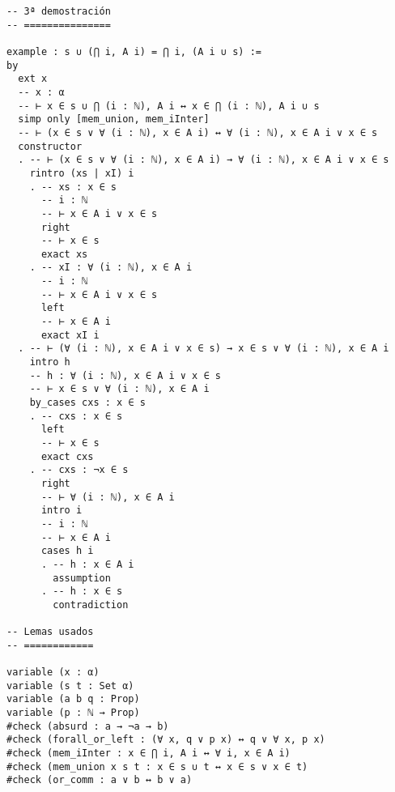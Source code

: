 \begin{verbatim}
-- 3ª demostración
-- ===============

example : s ∪ (⋂ i, A i) = ⋂ i, (A i ∪ s) :=
by
  ext x
  -- x : α
  -- ⊢ x ∈ s ∪ ⋂ (i : ℕ), A i ↔ x ∈ ⋂ (i : ℕ), A i ∪ s
  simp only [mem_union, mem_iInter]
  -- ⊢ (x ∈ s ∨ ∀ (i : ℕ), x ∈ A i) ↔ ∀ (i : ℕ), x ∈ A i ∨ x ∈ s
  constructor
  . -- ⊢ (x ∈ s ∨ ∀ (i : ℕ), x ∈ A i) → ∀ (i : ℕ), x ∈ A i ∨ x ∈ s
    rintro (xs | xI) i
    . -- xs : x ∈ s
      -- i : ℕ
      -- ⊢ x ∈ A i ∨ x ∈ s
      right
      -- ⊢ x ∈ s
      exact xs
    . -- xI : ∀ (i : ℕ), x ∈ A i
      -- i : ℕ
      -- ⊢ x ∈ A i ∨ x ∈ s
      left
      -- ⊢ x ∈ A i
      exact xI i
  . -- ⊢ (∀ (i : ℕ), x ∈ A i ∨ x ∈ s) → x ∈ s ∨ ∀ (i : ℕ), x ∈ A i
    intro h
    -- h : ∀ (i : ℕ), x ∈ A i ∨ x ∈ s
    -- ⊢ x ∈ s ∨ ∀ (i : ℕ), x ∈ A i
    by_cases cxs : x ∈ s
    . -- cxs : x ∈ s
      left
      -- ⊢ x ∈ s
      exact cxs
    . -- cxs : ¬x ∈ s
      right
      -- ⊢ ∀ (i : ℕ), x ∈ A i
      intro i
      -- i : ℕ
      -- ⊢ x ∈ A i
      cases h i
      . -- h : x ∈ A i
        assumption
      . -- h : x ∈ s
        contradiction

-- Lemas usados
-- ============

variable (x : α)
variable (s t : Set α)
variable (a b q : Prop)
variable (p : ℕ → Prop)
#check (absurd : a → ¬a → b)
#check (forall_or_left : (∀ x, q ∨ p x) ↔ q ∨ ∀ x, p x)
#check (mem_iInter : x ∈ ⋂ i, A i ↔ ∀ i, x ∈ A i)
#check (mem_union x s t : x ∈ s ∪ t ↔ x ∈ s ∨ x ∈ t)
#check (or_comm : a ∨ b ↔ b ∨ a)
\end{verbatim}

